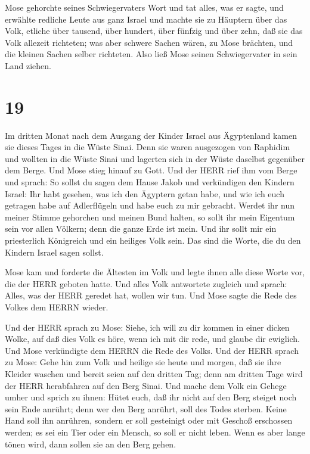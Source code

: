  Mose gehorchte seines Schwiegervaters Wort und tat alles,
was er sagte,  und erwählte redliche Leute aus ganz Israel
und machte sie zu Häuptern über das Volk, etliche über tausend, über
hundert, über fünfzig und über zehn,  daß sie das Volk
allezeit richteten; was aber schwere Sachen wären, zu Mose brächten, und
die kleinen Sachen selber richteten.  Also ließ Mose seinen
Schwiegervater in sein Land ziehen.

\hypertarget{section-18}{%
\section{19}\label{section-18}}

 Im dritten Monat nach dem Ausgang der Kinder Israel aus
Ägyptenland kamen sie dieses Tages in die Wüste Sinai.  Denn
sie waren ausgezogen von Raphidim und wollten in die Wüste Sinai und
lagerten sich in der Wüste daselbst gegenüber dem Berge. 
Und Mose stieg hinauf zu Gott. Und der HERR rief ihm vom Berge und
sprach: So sollst du sagen dem Hause Jakob und verkündigen den Kindern
Israel:  Ihr habt gesehen, was ich den Ägyptern getan habe,
und wie ich euch getragen habe auf Adlerflügeln und habe euch zu mir
gebracht.  Werdet ihr nun meiner Stimme gehorchen und meinen
Bund halten, so sollt ihr mein Eigentum sein vor allen Völkern; denn die
ganze Erde ist mein.  Und ihr sollt mir ein priesterlich
Königreich und ein heiliges Volk sein. Das sind die Worte, die du den
Kindern Israel sagen sollst.

 Mose kam und forderte die Ältesten im Volk und legte ihnen
alle diese Worte vor, die der HERR geboten hatte.  Und alles
Volk antwortete zugleich und sprach: Alles, was der HERR geredet hat,
wollen wir tun. Und Mose sagte die Rede des Volkes dem HERRN wieder.

 Und der HERR sprach zu Mose: Siehe, ich will zu dir kommen
in einer dicken Wolke, auf daß dies Volk es höre, wenn ich mit dir rede,
und glaube dir ewiglich. Und Mose verkündigte dem HERRN die Rede des
Volks.  Und der HERR sprach zu Mose: Gehe hin zum Volk und
heilige sie heute und morgen, daß sie ihre Kleider waschen 
und bereit seien auf den dritten Tag; denn am dritten Tage wird der HERR
herabfahren auf den Berg Sinai.  Und mache dem Volk ein
Gehege umher und sprich zu ihnen: Hütet euch, daß ihr nicht auf den Berg
steiget noch sein Ende anrührt; denn wer den Berg anrührt, soll des
Todes sterben.  Keine Hand soll ihn anrühren, sondern er
soll gesteinigt oder mit Geschoß erschossen werden; es sei ein Tier oder
ein Mensch, so soll er nicht leben. Wenn es aber lange tönen wird, dann
sollen sie an den Berg gehen.

